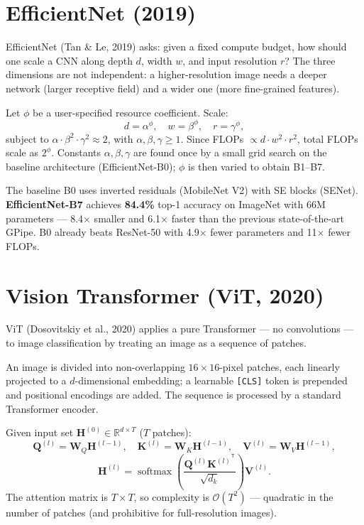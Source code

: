 \documentclass[11pt, oneside]{book}
\newcommand{\R}{\mathbb{R}}
\newcommand{\T}{^{\mathsf{T}}}
\DeclareMathOperator{\softmax}{softmax}
\newcommand{\bigO}[1]{\mathcal{O}\!\left(#1\right)}
\begin{document}
\section{EfficientNet (2019)}

EfficientNet (Tan \& Le, 2019) asks: given a fixed compute budget, how should one
scale a CNN along depth $d$, width $w$, and input resolution $r$?
The three dimensions are not independent: a higher-resolution image needs a deeper
network (larger receptive field) and a wider one (more fine-grained features).

\begin{thmbox}[title={Compound Scaling}]
Let $\phi$ be a user-specified resource coefficient. Scale:
\[
  d = \alpha^\phi,\quad w = \beta^\phi,\quad r = \gamma^\phi,
\]
subject to $\alpha \cdot \beta^2 \cdot \gamma^2 \approx 2$, with $\alpha,\beta,\gamma \geq 1$.
Since FLOPs $\propto d \cdot w^2 \cdot r^2$, total FLOPs scale as $2^\phi$.
Constants $\alpha, \beta, \gamma$ are found once by a small grid search on the
baseline architecture (EfficientNet-B0); $\phi$ is then varied to obtain B1–B7.
\end{thmbox}

The baseline B0 uses inverted residuals (MobileNet V2) with SE blocks (SENet).
\textbf{EfficientNet-B7} achieves \textbf{84.4\%} top-1 accuracy on ImageNet with
66M parameters — 8.4$\times$ smaller and 6.1$\times$ faster than the previous
state-of-the-art GPipe.
B0 already beats ResNet-50 with 4.9$\times$ fewer parameters and 11$\times$ fewer FLOPs.

\section{Vision Transformer (ViT, 2020)}

ViT (Dosovitskiy et al., 2020) applies a pure Transformer — no convolutions —
to image classification by treating an image as a sequence of patches.

An image is divided into non-overlapping $16\times16$-pixel patches,
each linearly projected to a $d$-dimensional embedding;
a learnable \texttt{[CLS]} token is prepended and positional encodings are added.
The sequence is processed by a standard Transformer encoder.

\begin{defbox}[title={Self-Attention (single head)}]
Given input set $\mathbf{H}^{(0)} \in \R^{d\times T}$ ($T$ patches):
\[
  \mathbf{Q}^{(l)} = \mathbf{W}_Q \mathbf{H}^{(l-1)},\quad
  \mathbf{K}^{(l)} = \mathbf{W}_K \mathbf{H}^{(l-1)},\quad
  \mathbf{V}^{(l)} = \mathbf{W}_V \mathbf{H}^{(l-1)},
\]
\[
  \mathbf{H}^{(l)} = \softmax\!\left(\frac{\mathbf{Q}^{(l)} {\mathbf{K}^{(l)}}^\T}{\sqrt{d_k}}\right)\mathbf{V}^{(l)}.
\]
The attention matrix is $T\times T$, so complexity is $\bigO{T^2}$ —
quadratic in the number of patches (and prohibitive for full-resolution images).
\end{defbox}
\end{document}
